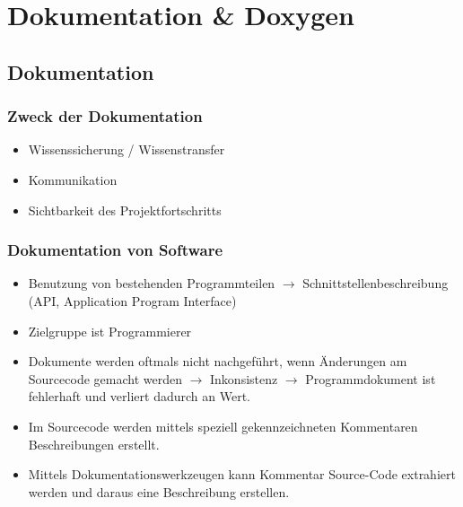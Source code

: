 \section{Dokumentation \& Doxygen}
\subsection{Dokumentation}
\subsubsection{Zweck der Dokumentation}
\begin{itemize}
	\item Wissenssicherung / Wissenstransfer
	\item Kommunikation
	\item Sichtbarkeit des Projektfortschritts
\end{itemize}
\subsubsection{Dokumentation von Software}
\begin{minipage}{\linewidth}
\begin{itemize}
	\item Benutzung von bestehenden Programmteilen \newline $\rightarrow$ Schnittstellenbeschreibung (API, Application Program Interface)
	\item Zielgruppe ist Programmierer
	\item Dokumente werden oftmals nicht nachgeführt, wenn Änderungen am Sourcecode gemacht werden $\rightarrow$ Inkonsistenz \newline $\rightarrow$ Programmdokument ist fehlerhaft und verliert dadurch an Wert.
	\item Im Sourcecode werden mittels speziell gekennzeichneten Kommentaren Beschreibungen erstellt.
	\item Mittels Dokumentationswerkzeugen kann Kommentar Source-Code extrahiert werden und daraus eine Beschreibung erstellen.  
\end{itemize}
\end{minipage}
